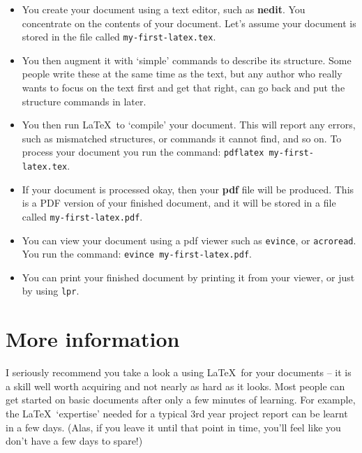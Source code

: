 \documentclass[12pt,a4paper]{article}
\begin{document}
\begin{itemize}


\item You create your document using a text editor, such as \textbf{nedit}.
You concentrate on the contents of your document. Let's assume your document
is stored in the file called \texttt{my-first-latex.tex}.

\item You then augment it with `simple' commands to describe its structure.
Some people write these at the same time as the text, but any author who
really wants to focus on the text first and get that right, can go back and
put the structure commands in later.

\item You then run \LaTeX\ to `compile' your document. This will report any
errors, such as mismatched structures, or commands it cannot find, and so on.
To process your document you run the command: \texttt{pdflatex
my-first-latex.tex}.

\item If your document is processed okay, then your \textbf{pdf} file will be
produced. This is a PDF version of your finished document, and
it will be stored in a file called \texttt{my-first-latex.pdf}.

\item You can view your document using a pdf viewer such as \texttt{evince}, or \texttt{acroread}. You
run the command: \texttt{evince my-first-latex.pdf}.

\item You can print your finished document by printing it from your viewer, or just by using \texttt{lpr}.

\end{itemize}


\section{More information}

I seriously recommend you take a look a using \LaTeX\ for your documents -- it
is a skill well worth acquiring and not nearly as hard as it looks. Most
people can get started on basic documents after only a few minutes of
learning. For example, the \LaTeX\ `expertise' needed for a typical 3rd year
project report can be learnt in a few days. (Alas, if you leave it until that
point in time, you'll feel like you don't have a few days to spare!)
\end{document}
